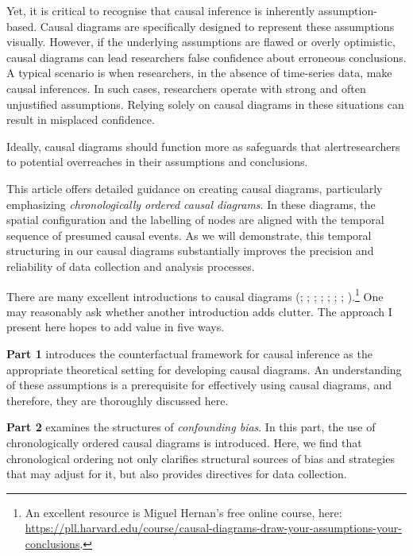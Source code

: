 \documentclass[
  singlecolumn,
  9pt]{article}
\begin{document}
Yet, it is critical to recognise that causal inference is inherently
assumption-based. Causal diagrams are specifically designed to represent
these assumptions visually. However, if the underlying assumptions are
flawed or overly optimistic, causal diagrams can lead researchers false
confidence about erroneous conclusions. A typical scenario is when
researchers, in the absence of time-series data, make causal inferences.
In such cases, researchers operate with strong and often unjustified
assumptions. Relying solely on causal diagrams in these situations can
result in misplaced confidence.

Ideally, causal diagrams should function more as safeguards that
alertresearchers to potential overreaches in their assumptions and
conclusions.

This article offers detailed guidance on creating causal diagrams,
particularly emphasizing \emph{chronologically ordered causal diagrams}.
In these diagrams, the spatial configuration and the labelling of nodes
are aligned with the temporal sequence of presumed causal events. As we
will demonstrate, this temporal structuring in our causal diagrams
substantially improves the precision and reliability of data collection
and analysis processes.

There are many excellent introductions to causal diagrams
(;
;
;
;
;
; ; ).\footnote{An
  excellent resource is Miguel Hernan's free online course, here:
  \url{https://pll.harvard.edu/course/causal-diagrams-draw-your-assumptions-your-conclusions}.}
One may reasonably ask whether another introduction adds clutter. The
approach I present here hopes to add value in five ways.

\textbf{Part 1} introduces the counterfactual framework for causal
inference as the appropriate theoretical setting for developing causal
diagrams. An understanding of these assumptions is a prerequisite for
effectively using causal diagrams, and therefore, they are thoroughly
discussed here.

\textbf{Part 2} examines the structures of \emph{confounding bias}. In
this part, the use of chronologically ordered causal diagrams is
introduced. Here, we find that chronological ordering not only clarifies
structural sources of bias and strategies that may adjust for it, but
also provides directives for data collection.
\end{document}
